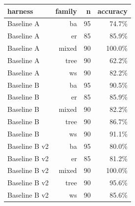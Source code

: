 \begin{tabular}{lrrr}
\toprule
harness & family & n & accuracy \\
\midrule
Baseline A & ba & 95 & 74.7\% \\
Baseline A & er & 85 & 85.9\% \\
Baseline A & mixed & 90 & 100.0\% \\
Baseline A & tree & 90 & 62.2\% \\
Baseline A & ws & 90 & 82.2\% \\
Baseline B & ba & 95 & 90.5\% \\
Baseline B & er & 85 & 85.9\% \\
Baseline B & mixed & 90 & 82.2\% \\
Baseline B & tree & 90 & 86.7\% \\
Baseline B & ws & 90 & 91.1\% \\
Baseline B v2 & ba & 95 & 80.0\% \\
Baseline B v2 & er & 85 & 81.2\% \\
Baseline B v2 & mixed & 90 & 100.0\% \\
Baseline B v2 & tree & 90 & 95.6\% \\
Baseline B v2 & ws & 90 & 85.6\% \\
\bottomrule
\end{tabular}
